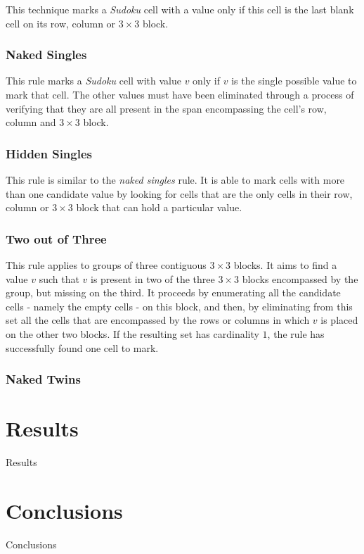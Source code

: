 \documentclass{article}
\begin{document}
This technique marks a {\em Sudoku} cell with a value only if this cell is the last blank cell on its row, column or $3 \times 3$ block.

\subsubsection{Naked Singles}

This rule marks a {\em Sudoku} cell with value $v$ only if $v$ is the single possible value to mark that cell. The other values must have been eliminated through a process of verifying that they are all present in the span encompassing the cell's row, column and $3 \times 3$ block.

\subsubsection{Hidden Singles}

This rule is similar to the {\em naked singles} rule. It is able to mark cells with more than one candidate value by looking for cells that are the only cells in their row, column or $3 \times 3$ block that can hold a particular value.

\subsubsection{Two out of Three}

This rule applies to groups of three contiguous $3 \times 3$ blocks. It aims to find a value $v$ such that $v$ is present in two of the three $3 \times 3$ blocks encompassed by the group, but missing on the third. It proceeds by enumerating all the candidate cells - namely the empty cells - on this block, and then, by eliminating from this set all the cells that are encompassed by the rows or columns in which $v$ is placed on the other two blocks. If the resulting set has cardinality $1$, the rule has successfully found one cell to mark.

\subsubsection{Naked Twins}

\section{Results}

Results

\section{Conclusions}

Conclusions



\end{document}
